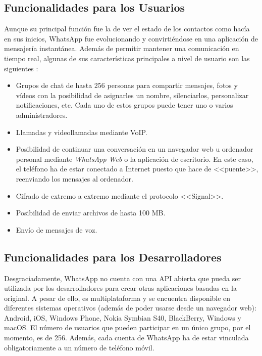 \subsection{Funcionalidades para los Usuarios}
Aunque su principal función fue la de ver el estado de los contactos como hacía en sus inicios, WhatsApp fue evolucionando y convirtiéndose en una aplicación de mensajería instantánea. Además de permitir mantener una comunicación en tiempo real, algunas de sus características principales a nivel de usuario son las siguientes \cite{WhatsApp2017}:

\begin{itemize}
	\item Grupos de chat de hasta 256 personas para compartir mensajes, fotos y vídeos con la posibilidad de asignarles un nombre, silenciarlos, personalizar notificaciones, etc. Cada uno de estos grupos puede tener uno o varios administradores.
	\item Llamadas y videollamadas mediante \acf{VoIP}.
	\item Posibilidad de continuar una conversación en un navegador web u ordenador personal mediante \textit{WhatsApp Web} o la aplicación de escritorio. En este caso, el teléfono ha de estar conectado a Internet puesto que hace de <<puente>>, reenviando los mensajes al ordenador.
	\item Cifrado de extremo a extremo mediante el protocolo <<Signal>>.
	\item Posibilidad de enviar archivos de hasta 100 \acs{MB}.
	\item Envío de mensajes de voz.
\end{itemize}


\subsection{Funcionalidades para los Desarrolladores}
Desgraciadamente, WhatsApp no cuenta con una \acs{API} abierta que pueda ser utilizada por los desarrolladores para crear otras aplicaciones basadas en la original. A pesar de ello, es multiplataforma y se encuentra disponible en diferentes sistemas operativos (además de poder usarse desde un navegador web): Android, iOS, Windows Phone, Nokia Symbian S40, BlackBerry, Windows y macOS. El número de usuarios que pueden participar en un único grupo, por el momento, es de 256. Además, cada cuenta de WhatsApp ha de estar vinculada obligatoriamente a un número de teléfono móvil.

